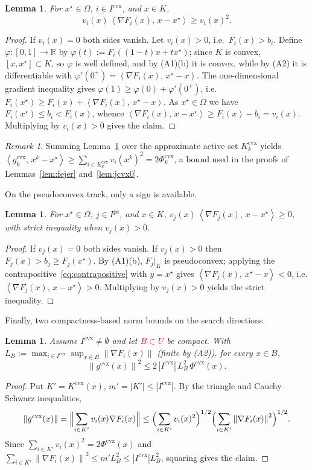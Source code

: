 \documentclass[]{interact}
\theoremstyle{plain}
\newtheorem{lemma}[theorem]{Lemma}
\theoremstyle{definition}
\theoremstyle{remark}
\newtheorem{remark}{Remark}
\newcommand{\R}{\mathbb{R}}
\newcommand{\norm}[1]{\left\lVert #1 \right\rVert}
\newcommand{\abs}[1]{\left\lvert #1 \right\rvert}
\newcommand{\inner}[2]{\left\langle #1,\, #2 \right\rangle}
\newcommand{\cvx}{\mathrm{cvx}}
\newcommand{\ps}{\mathrm{ps}}
\begin{document}
\begin{lemma}\label{lem:grad-cvx}
For $x^\star\in\Omega$, $i\in I^{\cvx}$, and $x\in K$,
\[
v_i(x)\,\inner{\nabla F_i(x)}{x-x^\star}\ge v_i(x)^2 .
\]
\end{lemma}
\begin{proof}
If $v_i(x)=0$ both sides vanish. Let $v_i(x)>0$, i.e.\ $F_i(x)>b_i$. Define
$\varphi:[0,1]\to\R$ by $\varphi(t):=F_i((1-t)x+tx^\star)$; since $K$ is convex,
$[x,x^\star]\subset K$, so $\varphi$ is well defined, and by (A1)(b) it is convex, while
by (A2) it is differentiable with $\varphi'(0^+)=\inner{\nabla F_i(x)}{x^\star-x}$. The
one-dimensional gradient inequality gives $\varphi(1)\ge\varphi(0)+\varphi'(0^+)$, i.e.
$F_i(x^\star)\ge F_i(x)+\inner{\nabla F_i(x)}{x^\star-x}$. As $x^\star\in\Omega$ we have
$F_i(x^\star)\le b_i<F_i(x)$, whence
$\inner{\nabla F_i(x)}{x-x^\star}\ge F_i(x)-b_i=v_i(x)$. Multiplying by $v_i(x)>0$ gives
the claim.
\end{proof}

\begin{remark}\label{rem:grad-cvx-sum}
Summing Lemma~\ref{lem:grad-cvx} over the approximate active set $K^{\cvx}_k$ yields
$\inner{g^{\cvx}_k}{x^k-x^\star}\ge\sum_{i\in K^{\cvx}_k}v_i(x^k)^2=2\Phi^{\cvx}_k$, a bound
used in the proofs of Lemmas~\ref{lem:fejer} and~\ref{lem:jcvx0}.
\end{remark}

On the pseudoconvex track, only a sign is available.

\begin{lemma}\label{lem:sign-ps}
For $x^\star\in\Omega$, $j\in I^{\ps}$, and $x\in K$,
$v_j(x)\,\inner{\nabla F_j(x)}{x-x^\star}\ge 0$, with strict inequality when $v_j(x)>0$.
\end{lemma}
\begin{proof}
If $v_j(x)=0$ both sides vanish. If $v_j(x)>0$ then $F_j(x)>b_j\ge F_j(x^\star)$. By
(A1)(b), $F_j|_K$ is pseudoconvex; applying the contrapositive~\eqref{eq:contrapositive}
with $y=x^\star$ gives $\inner{\nabla F_j(x)}{x^\star-x}<0$, i.e.
$\inner{\nabla F_j(x)}{x-x^\star}>0$. Multiplying by $v_j(x)>0$ yields the strict
inequality.
\end{proof}

Finally, two compactness-based norm bounds on the search directions.

\begin{lemma}\label{lem:bound-cvx}
Assume $I^{\cvx}\ne\emptyset$ and let \leavevmode\textcolor{red}{$B\subset U$} be compact. With
$L_B:=\max_{i\in I^{\cvx}}\sup_{x\in B}\norm{\nabla F_i(x)}$ (finite by (A2)), for every
$x\in B$,
\[
\norm{g^{\cvx}(x)}^2\le 2\,\abs{I^{\cvx}}\,L_B^2\,\Phi^{\cvx}(x).
\]
\end{lemma}
\begin{proof}
Put $K'=K^{\cvx}(x)$, $m'=\abs{K'}\le\abs{I^{\cvx}}$. By the triangle and Cauchy--Schwarz
inequalities,
\[
\norm{g^{\cvx}(x)}=\Bigl\|\sum_{i\in K'}v_i(x)\nabla F_i(x)\Bigr\|
\le\Bigl(\sum_{i\in K'}v_i(x)^2\Bigr)^{1/2}\Bigl(\sum_{i\in K'}\norm{\nabla F_i(x)}^2\Bigr)^{1/2}.
\]
Since $\sum_{i\in K'}v_i(x)^2=2\Phi^{\cvx}(x)$ and
$\sum_{i\in K'}\norm{\nabla F_i(x)}^2\le m'L_B^2\le\abs{I^{\cvx}}L_B^2$, squaring gives the
claim.
\end{proof}
\end{document}
